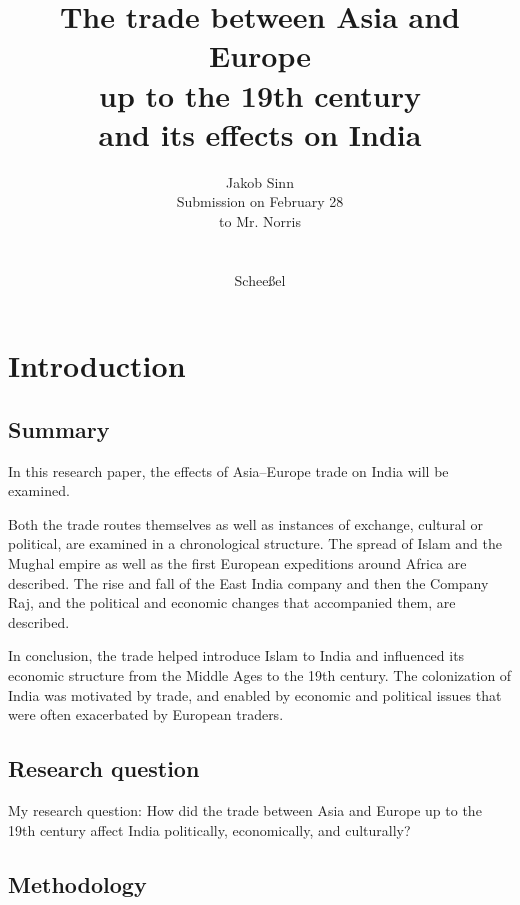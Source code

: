 \documentclass[11pt, a4paper, headings=standardclasses]{scrartcl}
\begin{document}
\subject{Facharbeit}
\author{Jakob Sinn \\ Submission on February 28 \\ to Mr. Norris \\ \\ \\ Scheeßel}
\title{The trade between Asia and Europe \\ up to the 19th century \\ and its effects on India}
\maketitle
\thispagestyle{empty}
\clearpage
{}
\begin{singlespace}
\tableofcontents
\clearpage
\end{singlespace}
\section{Introduction}
\subsection{Summary}
In this research paper, the effects of Asia--Europe trade on India will be examined.

Both the trade routes themselves as well as instances of exchange, cultural or political, are examined in a chronological structure. The spread of Islam and the Mughal empire as well as the first European expeditions around Africa are described. The rise and fall of the East India company and then the Company Raj, and the political and economic changes that accompanied them, are described.

In conclusion, the trade helped introduce Islam to India and influenced its economic structure from the Middle Ages to the 19th century. The colonization of India was motivated by trade, and enabled by economic and political issues that were often exacerbated by European traders.
\subsection{Research question}
My research question: How did the trade between Asia and Europe up to the 19th century affect India politically, economically, and culturally?
\subsection{Methodology}
\end{document}
